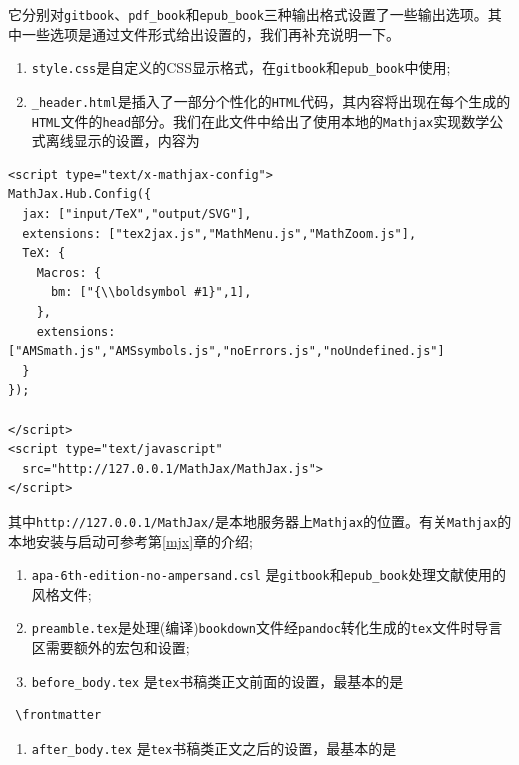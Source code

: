 \documentclass[12pt,]{krantz}
\providecommand{\tightlist}{%
  \setlength{\itemsep}{0pt}\setlength{\parskip}{0pt}}
\theoremstyle{plain}
\theoremstyle{nonumberplain}
\begin{document}
它分别对\texttt{gitbook}、\texttt{pdf\_book}和\texttt{epub\_book}三种输出格式设置了一些输出选项。其中一些选项是通过文件形式给出设置的，我们再补充说明一下。

\begin{enumerate}
\def\labelenumi{\arabic{enumi}.}
\item
  \texttt{style.css}是自定义的CSS显示格式，在\texttt{gitbook}和\texttt{epub\_book}中使用;
\item
  \texttt{\_header.html}是插入了一部分个性化的\texttt{HTML}代码，其内容将出现在每个生成的\texttt{HTML}文件的\texttt{head}部分。我们在此文件中给出了使用本地的\texttt{Mathjax}实现数学公式离线显示的设置，内容为
\end{enumerate}

\begin{verbatim}
<script type="text/x-mathjax-config">
MathJax.Hub.Config({
  jax: ["input/TeX","output/SVG"],
  extensions: ["tex2jax.js","MathMenu.js","MathZoom.js"],
  TeX: {
    Macros: {
      bm: ["{\\boldsymbol #1}",1],
    }, 
    extensions: ["AMSmath.js","AMSsymbols.js","noErrors.js","noUndefined.js"]
  }
});

</script>
<script type="text/javascript"
  src="http://127.0.0.1/MathJax/MathJax.js">
</script>
\end{verbatim}

其中\texttt{http://127.0.0.1/MathJax/}是本地服务器上\texttt{Mathjax}的位置。有关\texttt{Mathjax}的本地安装与启动可参考第\ref{mjx}章的介绍;

\begin{enumerate}
\def\labelenumi{\arabic{enumi}.}
\setcounter{enumi}{2}
\item
  \texttt{apa-6th-edition-no-ampersand.csl} 是\texttt{gitbook}和\texttt{epub\_book}处理文献使用的风格文件;
\item
  \texttt{preamble.tex}是处理(编译)\texttt{bookdown}文件经\texttt{pandoc}转化生成的\texttt{tex}文件时导言区需要额外的宏包和设置;
\item
  \texttt{before\_body.tex} 是\texttt{tex}书稿类正文前面的设置，最基本的是
\end{enumerate}

\begin{verbatim}
 \frontmatter
\end{verbatim}

\begin{enumerate}
\def\labelenumi{\arabic{enumi}.}
\setcounter{enumi}{5}
\tightlist
\item
  \texttt{after\_body.tex} 是\texttt{tex}书稿类正文之后的设置，最基本的是
\end{enumerate}
\end{document}
